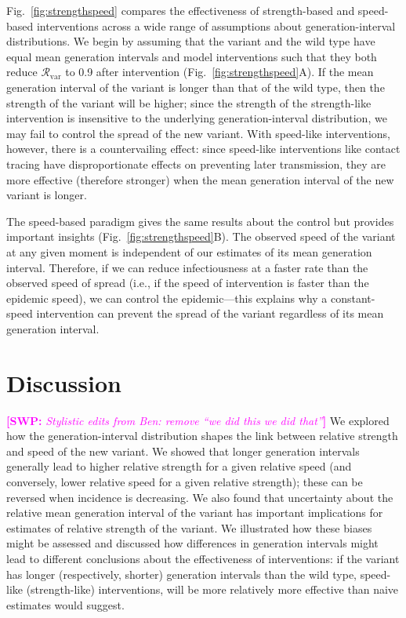 \documentclass[12pt]{article}
\newcommand{\comment}{\showcomment}
\newcommand{\showcomment}[3]{\textcolor{#1}{\textbf{[#2: }\textsl{#3}\textbf{]}}}
\newcommand{\swp}[1]{\comment{magenta}{SWP}{#1}}
\newcommand{\fref}[1]{Fig.~\ref{fig:#1}}
\newcommand{\vvvar}{\mathrm{var}}
\newcommand{\Rx}[1]{\ensuremath{{\mathcal R}_{#1}}\xspace}
\newcommand{\Rv}{\Rx{\vvvar}}
\begin{document}
\fref{strengthspeed} compares the effectiveness of strength-based and speed-based interventions across a wide range of assumptions about generation-interval distributions.
We begin by assuming that the variant and the wild type have equal mean generation intervals and model interventions such that they both reduce $\Rv$ to 0.9 after intervention (\fref{strengthspeed}A).
If the mean generation interval of the variant is longer than that of the wild type, then the strength of the variant will be higher;
since the strength of the strength-like intervention is insensitive to the underlying generation-interval distribution, we may fail to control the spread of the new variant.
With speed-like interventions, however, there is a countervailing effect:
since speed-like interventions like contact tracing have disproportionate effects on preventing later transmission, they are more effective (therefore stronger) when the mean generation interval of the new variant is longer. 

The speed-based paradigm gives the same results about the control but provides important insights (\fref{strengthspeed}B).
The observed speed of the variant at any given moment is independent of our estimates of its mean generation interval.
Therefore, if we can reduce infectiousness at a faster rate than the observed speed of spread (i.e., if the speed of intervention is faster than the epidemic speed), we can control the epidemic---this explains why a constant-speed intervention can prevent the spread of the variant regardless of its mean generation interval.

\section{Discussion}

\swp{Stylistic edits from Ben: remove ``we did this we did that''}
We explored how the generation-interval distribution shapes the link between relative strength and speed of the new variant.
We showed that longer generation intervals generally lead to higher relative strength for a given relative speed (and conversely, lower relative speed for a given relative strength); these can be reversed when incidence is decreasing.
We also found that uncertainty about the relative mean generation interval of the variant has important implications for estimates of relative strength of the variant.
We illustrated how these biases might be assessed and discussed how differences in generation intervals might lead to different conclusions about the effectiveness of interventions:
if the variant has longer (respectively, shorter) generation intervals than the wild type, speed-like (strength-like) interventions, will be more relatively more effective than naive estimates would suggest. 
\end{document}
